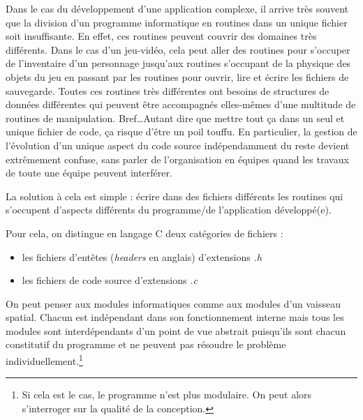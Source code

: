 \documentclass[../../../main.tex]{subfiles}
\begin{document}
Dans le cas du développement d'une application complexe, il arrive très souvent que la division d'un programme informatique en routines dans un unique fichier soit insuffisante. En effet, ces routines peuvent couvrir des domaines très différents. Dans le cas d'un jeu-vidéo, cela peut aller des routines pour s'occuper de l'inventaire d'un personnage jusqu'aux routines s'occupant de la physique des objets du jeu en passant par les routines pour ouvrir, lire et écrire les fichiers de sauvegarde. Toutes ces routines très différentes ont besoins de structures de données différentes qui peuvent être accompagnés elles-mêmes d'une multitude de routines de manipulation.  
Bref\dots Autant dire que mettre tout ça dans un seul et unique fichier de code, ça risque d'être un poil touffu. En particulier, la gestion de l'évolution d'un unique aspect du code source indépendamment du reste devient extrêmement confuse, sans parler de l'organisation en équipes quand les travaux de toute une équipe peuvent interférer. 
 
La solution à cela est simple : écrire dans des fichiers différents les routines qui s'occupent d'aspects différents du programme/de l'application développé(e).
 
Pour cela, on distingue en langage C deux catégories de fichiers :
\begin{itemize}
	\item les fichiers d'entêtes (\textit{headers} en anglais) d'extensions \textit{.h}
	\item les fichiers de code source d'extensions \textit{.c}
\end{itemize}
 
On peut penser aux modules informatiques comme aux modules d'un vaisseau spatial. Chacun est indépendant dans son fonctionnement interne mais tous les modules sont interdépendants d'un point de vue abstrait puisqu'ils sont chacun constitutif du programme et ne peuvent pas résoudre le problème individuellement.\footnote{Si cela est le cas, le programme n'est plus modulaire. On peut alors s'interroger sur la qualité de la conception.}
 
\end{document}
